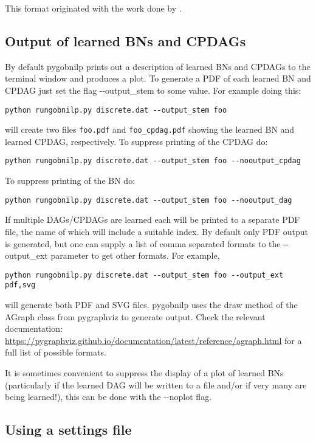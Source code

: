 \documentclass{article}
\newcommand{\pygobnilp}{\textsf{pygobnilp}}
\begin{document}
This format originated with the work done by \citet{jaakkola10:_learn_bayes_networ_struc_lp_relax}.

\subsection{Output of learned BNs and CPDAGs}
\label{sec:output}

By default \pygobnilp{} prints out a description of learned BNs and
CPDAGs to the terminal window and produces a plot. To generate a PDF
of each learned BN and CPDAG just set the flag -{}-output\_stem to some
value. For example doing this:
\begin{verbatim}
python rungobnilp.py discrete.dat --output_stem foo
\end{verbatim}
will create two files \verb+foo.pdf+ and \verb+foo_cpdag.pdf+ showing
the learned BN and learned CPDAG, respectively. To suppress printing of
the CPDAG do:
\begin{verbatim}
python rungobnilp.py discrete.dat --output_stem foo --nooutput_cpdag
\end{verbatim}
To suppress printing of
the BN do:
\begin{verbatim}
python rungobnilp.py discrete.dat --output_stem foo --nooutput_dag
\end{verbatim}
If multiple DAGs/CPDAGs are learned each will be printed to a separate
PDF file, the name of which will include a suitable
index. By default only PDF output is generated, but one can supply a
list of comma separated formats to the -{}-output\_ext parameter to
get other formats. For example, 
\begin{verbatim}
python rungobnilp.py discrete.dat --output_stem foo --output_ext pdf,svg
\end{verbatim}
will generate both PDF and SVG files. \pygobnilp{} uses the draw
method of the AGraph class from pygraphviz to generate output. Check
the relevant documentation:
\url{https://pygraphviz.github.io/documentation/latest/reference/agraph.html}
for a full list of possible formats.

It is sometimes convenient to suppress the display of a plot of
learned BNs (particularly if the learned DAG will be written to a file
and/or if very many are being learned!), this can
be done with the -{}-noplot flag.

\subsection{Using a settings file}
\label{sec:settings}
\end{document}
